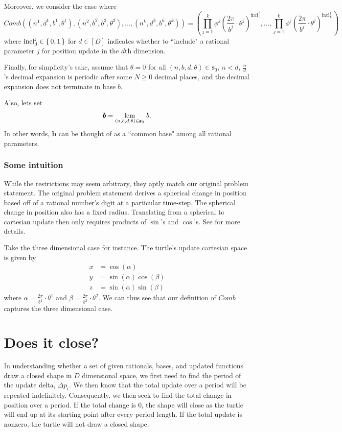 \documentclass[11pt,titlepage]{article}
\newcommand{\comb}{Comb}
\newcommand{\inclIndic}[2]{{\mathrm{incl}_{#1}^{#2}}}
\newcommand{\numbToAngle}{\frac{2\pi}{b^j}}
\newcommand{\numbToAngleNoJ}[1]{\frac{2\pi}{b^{#1}}}
\newcommand{\commonBase}{{\pmb{b}}}
\newcommand{\sinOrCos}{\phi^j}
\newcommand{\combSingleTerm}[1]{\prod_{j=1}^k \sinOrCos\left(\numbToAngle \cdot \theta^j\right) ^ {\inclIndic{#1}{j}}}
\begin{document}
Moreover, we consider the case where
$$
  Comb((n^1, d^1, b^1, \theta^1), (n^2, b^2, b^2, \theta^2), ..., (n^k, d^k, b^k, \theta^k)) =
    \left(\combSingleTerm{1}, ..., \combSingleTerm{D}\right)
$$
where $\mathrm{incl}_d^j \in \set{0, 1}$ for $d \in [D]$ indicates whether to ``include" a
rational parameter $j$ for position update in the $d$th dimension.

Finally, for simplicity's sake, assume that $\theta = 0$ for all $(n, b, d, \theta) \in \pmb{s}_0$,
$n < d$, $\frac{n}{d}$'s decimal expansion is periodic after some $N \geq 0$ decimal places,
and the decimal expansion does not terminate in base $b$.

Also, lets set 
$$\commonBase = \lcm{(n, b, d, \theta) \in \pmb{s}_0} b.$$
In other words,
$\commonBase$ can be thought of as a ``common base" among all rational parameters.

\subsubsection{Some intuition}
While the restrictions may seem arbitrary, they aptly match our original problem statement.
The original problem statement derives a spherical change in position based off of a rational number's
digit at a particular time-step. The spherical change in position also has a fixed radius. Translating
from a spherical to cartesian update then only requires products of $\sin$'s and $\cos$'s. See \cite{NDimSphericalCoord}
for more details.

Take the three dimensional case for instance. The turtle's update cartesian space
is given by 
\begin{align*}
  x &= \cos(\alpha)\\
  y &= \sin(\alpha) \cos(\beta)\\
  z &= \sin(\alpha) \sin(\beta)
\end{align*}
where $\alpha = \numbToAngleNoJ{1} \cdot \theta^1$ and 
$\beta = \numbToAngleNoJ{2} \cdot \theta^2$. We can thus see that our definition
of $\comb$ captures the three dimensional case.




\section{Does it close?}
In understanding whether a set of given rationals, bases, and updated functions 
draw a closed shape in $D$ dimensional space, we first need to find the period of 
the update delta, $\Delta p_i$. We then know that the total update over a period will be repeated 
indefinitely. Consequently, we then seek to find the total change in position over a period. 
If the total change is $0$, the shape will close as the turtle will end up at its starting point
after every period length. If the total update is nonzero, the turtle will not draw a closed
shape.
\end{document}
